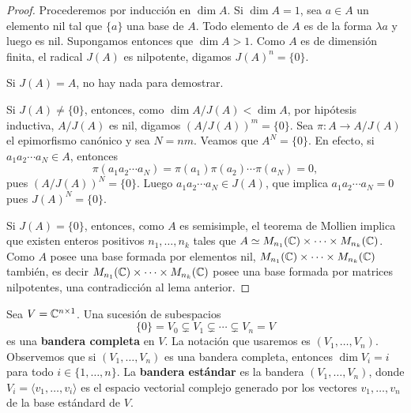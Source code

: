 \begin{proof}
%
	Procederemos por inducción en $\dim A$. Si $\dim A=1$, sea $a\in A$ un
	elemento nil tal que $\{a\}$ una base de $A$. Todo elemento de $A$ es de la
	forma $\lambda a$ y luego es nil.  Supongamos entonces que $\dim A>1$. Como
	$A$ es de dimensión finita, el radical
	$J(A)$ es nilpotente, digamos $J(A)^n=\{0\}$. 
	
	Si $J(A)=A$, no hay nada para
	demostrar. 
	
	Si $J(A)\ne\{0\}$, entonces, como $\dim A/J(A)<\dim A$, por
	hipótesis inductiva, $A/J(A)$ es nil, digamos $(A/J(A))^m=\{0\}$. 
	Sea $\pi\colon A\to A/J(A)$ el epimorfismo 
	canónico y sea $N=nm$. Veamos que $A^N=\{0\}$. En efecto, 
	si $a_1a_2\cdots a_N\in A$, entonces 
	\[
	\pi(a_1a_2\cdots a_N)=\pi(a_1)\pi(a_2)\cdots \pi(a_N)=0,
	\]
	pues $(A/J(A))^N=\{0\}$. Luego
	$a_1a_2\cdots a_N\in J(A)$, que implica $a_1a_2\cdots a_N=0$ pues
	$J(A)^N=\{0\}$.  
	
	Si $J(A)=\{0\}$, entonces, como $A$ es semisimple, 
	el teorema de Mollien implica
	que existen enteros positivos $n_1,\dots,n_k$ tales que $A\simeq
	M_{n_1}(\mathbb{C})\times\cdots\times M_{n_k}(\mathbb{C})$. Como $A$ posee una base formada
	por elementos nil, $M_{n_1}(\mathbb{C})\times\cdots\times M_{n_k}(\mathbb{C})$
	también, 
	es decir $M_{n_1}(\mathbb{C})\times\cdots\times M_{n_k}(\mathbb{C})$ posee una base formada por matrices nilpotentes, 
	una contradicción al lema anterior.
%	
\end{proof}

Sea $V=\mathbb{C}^{n\times 1}$. Una sucesión de subespacios 
\[
\{0\}=V_0\subsetneq V_1\subsetneq \cdots\subsetneq V_n=V
\]
es una \textbf{bandera completa} en $V$. La notación que usaremos es $(V_1,\dots,V_n)$. Observemos
que si $(V_1,\dots,V_n)$ es una bandera completa, entonces $\dim V_i=i$ para todo $i\in\{1,\dots,n\}$. 
La \textbf{bandera estándar} es la bandera $(V_1,\dots,V_n)$, donde
$V_i=\langle v_1,\dots,v_i\rangle$ es el espacio vectorial complejo
generado por los vectores $v_1,\dots,v_n$ de la base estándard de $V$. 

